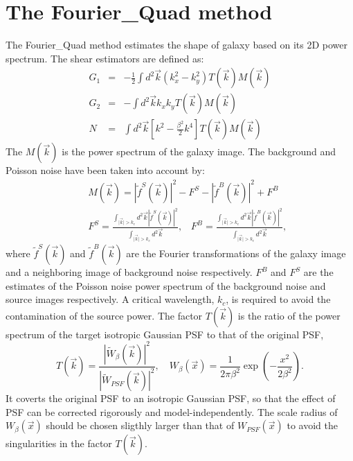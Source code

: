 \documentclass[twocolumn]{aastex62}
\begin{document}
\section{The Fourier\_Quad method}\label{sec:FQ}
The Fourier\_Quad method estimates the shape of galaxy based on its 2D power spectrum. The shear estimators are defined as:
\begin{eqnarray}
\label{shear_estimator}\label{FQ_GN}
G_1&=&-\frac{1}{2}\int d^2\vec{k}(k_x^2-k_y^2)T(\vec{k})M(\vec{k})\\ \nonumber
G_2&=&-\int d^2\vec{k}k_xk_yT(\vec{k})M(\vec{k})\\ \nonumber
N&=&\int d^2\vec{k}\left[k^2-\frac{\beta^2}{2}k^4\right]T(\vec{k})M(\vec{k})
\end{eqnarray}
The $M(\vec{k})$ is the power spectrum of the galaxy image. The background and Poisson noise have been taken into account by:
\begin{eqnarray}
\label{FQ_TM}
&&M(\vec{k})=\left\vert\widetilde{f}^S(\vec{k})\right\vert^2-F^S-\left\vert\widetilde{f}^B(\vec{k})\right\vert^2+F^B\\ \nonumber
&&F^S=\frac{\int_{\vert\vec{k}\vert > k_c} d^2\vec{k}\left\vert\widetilde{f}^S(\vec{k})\right\vert^2}{\int_{\vert\vec{k}\vert > k_c} d^2\vec{k}}, \;\;\; F^B=\frac{\int_{\vert\vec{k}\vert > k_c} d^2\vec{k}\left\vert\widetilde{f}^B(\vec{k})\right\vert^2}{\int_{\vert\vec{k}\vert > k_c} d^2\vec{k}},
\end{eqnarray}
where $\widetilde{f}^S(\vec{k})$ and $\widetilde{f}^B(\vec{k})$ are the Fourier transformations of the galaxy image and a neighboring image of background noise respectively. $F^B$ and $F^S$ are the estimates of the Poisson noise power spectrum of the background noise and source images respectively. A critical wavelength, $k_c$, is required to avoid the contamination of the source power\citep{Zhang2015}. The factor $T(\vec{k})$ is the ratio of the power spectrum of the target isotropic Gaussian PSF to that of the original PSF,
\begin{equation}
T(\vec{k}) = \frac{|\widetilde{W}_{\beta}(\vec{k})|^2}{|\widetilde{W}_{PSF}(\vec{k})|^2},\quad W_{\beta}(\vec{x})=\frac{1}{2\pi \beta^2}\exp(-\frac{x^2}{2\beta^2}).
\end{equation}
It coverts the original PSF to an isotropic Gaussian PSF, so that the effect of PSF can be corrected rigorously and model-independently. The scale radius of $W_{\beta}(\vec{x})$ should be chosen sligthly larger than that of $W_{PSF}(\vec{x})$ to avoid the singularities in the factor $T(\vec{k})$. 
\end{document}
